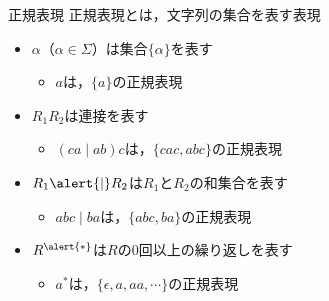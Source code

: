 \documentclass[dvipdfmx,beamer]{standalone}
\begin{document}
\begin{frame}{正規表現}
	正規表現とは，文字列の集合を表す表現
	\begin{itemize}
    \item $\alpha$（$\alpha \in \Sigma$）は集合$\{\alpha\}$を表す
			\begin{itemize}
        \item $a$は，$\{a\}$の正規表現
			\end{itemize}
		\item $R_1R_2$は連接を表す
			\begin{itemize}
				\item $(ca\mid ab)c$は，$\{cac, abc\}$の正規表現
			\end{itemize}
    \item $R_1\alert{\mid}R_2$は$R_1$と$R_2$の和集合を表す
			\begin{itemize}
				\item $abc\mid ba$は，$\{abc, ba\}$の正規表現
			\end{itemize}
    \item $R^{\alert{*}}$は$R$の$0$回以上の繰り返しを表す
			\begin{itemize}
				\item $a^*$は，$\{\epsilon, a, aa, \cdots\}$の正規表現
			\end{itemize}
	\end{itemize}
\end{frame}
\end{document}

